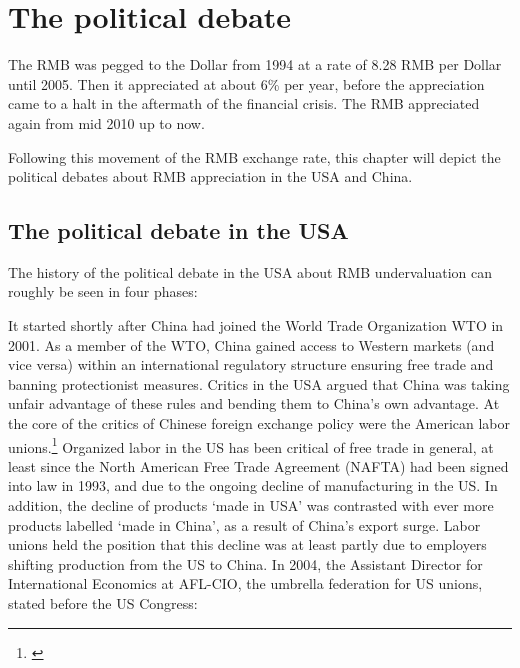 \section{The political debate}
\label{sec:politics}



The RMB was pegged to the Dollar from 1994 at a rate of 8.28 RMB per 
Dollar until 2005. Then it appreciated at about 6\% per year, before the 
appreciation came to a halt in the aftermath of the financial crisis.  
The RMB appreciated again from mid 2010 up to now.

Following this movement of the RMB exchange rate, this chapter will 
depict the political debates about RMB appreciation in the USA and 
China.


\subsection{The political debate in the USA}

The history of the political debate in the USA about RMB undervaluation 
can roughly be seen in four phases:

It started shortly after China had joined the World Trade Organization 
WTO in 2001. As a member of the WTO, China gained access to Western 
markets (and vice versa) within an international regulatory structure 
ensuring free trade and banning protectionist measures. Critics in the 
USA argued that China was taking unfair advantage of these rules and 
bending them to China's own advantage. At the core of the critics of 
Chinese foreign exchange policy were the American labor 
unions.\footnote{\cite[pp. 14]{Levy2011}} Organized labor in the US has 
been critical of free trade in general, at least since the North 
American Free Trade Agreement (NAFTA) had been signed into law in 1993, 
and due to the ongoing decline of manufacturing in the US. In addition, 
the decline of products `made in USA'  was contrasted with ever more 
products labelled `made in China', as a result of China's export surge. 
Labor unions held the position that this decline was at least partly due 
to employers shifting production from the US to China. In 2004, the 
Assistant Director for International Economics at AFL-CIO, the umbrella 
federation for US unions, stated before the US Congress: 

